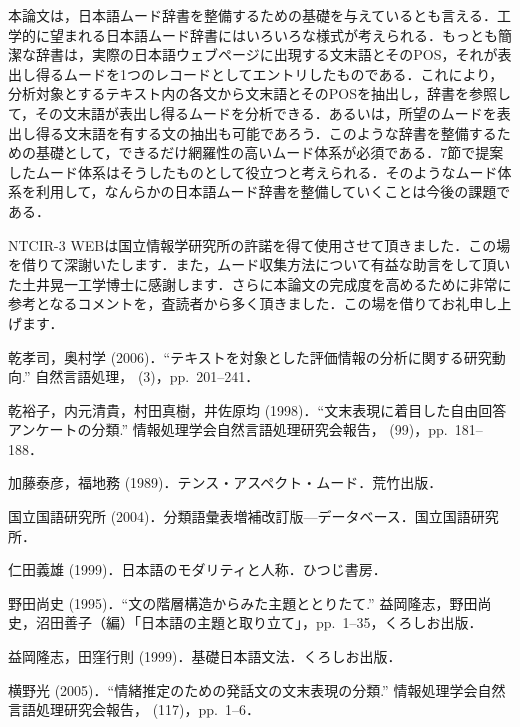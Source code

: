 \documentclass[japanese]{jnlp_1.4}
\begin{document}
本論文は，日本語ムード辞書を整備するための基礎を与えているとも言える．工学的に望まれる日本語ムード辞書にはいろいろな様式が考えられる．もっとも簡潔な辞書は，実際の日本語ウェブページに出現する文末語とそのPOS，それが表出し得るムードを1つのレコードとしてエントリしたものである．これにより，分析対象とするテキスト内の各文から文末語とそのPOSを抽出し，辞書を参照して，その文末語が表出し得るムードを分析できる．あるいは，所望のムードを表出し得る文末語を有する文の抽出も可能であろう．このような辞書を整備するための基礎として，できるだけ網羅性の高いムード体系が必須である．7節で提案したムード体系はそうしたものとして役立つと考えられる．そのようなムード体系を利用して，なんらかの日本語ムード辞書を整備していくことは今後の課題である．

\acknowledgment

NTCIR-3 
WEBは国立情報学研究所の許諾を得て使用させて頂きました．この場を借りて深謝いたします．また，ムード収集方法について有益な助言をして頂いた土井晃一工学博士に感謝します．さらに本論文の完成度を高めるために非常に参考となるコメントを，査読者から多く頂きました．この場を借りてお礼申し上げます．




\begin{thebibliography}{}

\item{}
乾孝司，奥村学 
(2006)．``テキストを対象とした評価情報の分析に関する研究動向.'' 
自然言語処理，{} (3)，pp.\ 201--241．

\item{}
乾裕子，内元清貴，村田真樹，井佐原均 
(1998)．``文末表現に着目した自由回答アンケートの分類.'' 
情報処理学会自然言語処理研究会報告，{} (99)，pp.\ 181--188．

\item{}
加藤泰彦，福地務 (1989)．テンス・アスペクト・ムード．荒竹出版．

\item{}
国立国語研究所 (2004)．分類語彙表増補改訂版—データベース．国立国語研究所．

\item{}
仁田義雄 (1999)．日本語のモダリティと人称．ひつじ書房．

\item{}
野田尚史 (1995)．``文の階層構造からみた主題ととりたて.'' 
益岡隆志，野田尚史，沼田善子（編）「日本語の主題と取り立て」，pp.\ 1--35，くろしお出版．

\item{}
益岡隆志，田窪行則 (1999)．基礎日本語文法．くろしお出版．

\item{}
横野光 (2005)．``情緒推定のための発話文の文末表現の分類.'' 
情報処理学会自然言語処理研究会報告，{} (117)，pp.\ 1--6．

\end{thebibliography}
\end{document}
